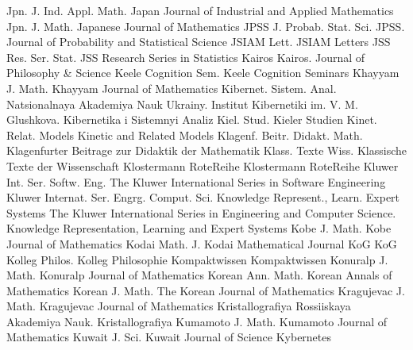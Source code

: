 {Jpn. J. Ind. Appl. Math.}
{Japan Journal of Industrial and Applied Mathematics}
{Jpn. J. Math.}
{Japanese Journal of Mathematics}
{JPSS J. Probab. Stat. Sci.}
{JPSS. Journal of Probability and Statistical Science}
{JSIAM Lett.}
{JSIAM Letters}
{JSS Res. Ser. Stat.}
{JSS Research Series in Statistics}
{Kairos}
{Kairos. Journal of Philosophy & Science}
{Keele Cognition Sem.}
{Keele Cognition Seminars}
{Khayyam J. Math.}
{Khayyam Journal of Mathematics}
{Kibernet. Sistem. Anal.}
{Natsionalnaya Akademiya Nauk Ukrainy. Institut Kibernetiki im. V. M. Glushkova. Kibernetika i Sistemnyi Analiz}
{Kiel. Stud.}
{Kieler Studien}
{Kinet. Relat. Models}
{Kinetic and Related Models}
{Klagenf. Beitr. Didakt. Math.}
{Klagenfurter Beitrage zur Didaktik der Mathematik}
{Klass. Texte Wiss.}
{Klassische Texte der Wissenschaft}
{Klostermann RoteReihe}
{Klostermann RoteReihe}
{Kluwer Int. Ser. Softw. Eng.}
{The Kluwer International Series in Software Engineering}
{Kluwer Internat. Ser. Engrg. Comput. Sci. Knowledge Represent., Learn. Expert Systems}
{The Kluwer International Series in Engineering and Computer Science. Knowledge Representation, Learning and Expert Systems}
{Kobe J. Math.}
{Kobe Journal of Mathematics}
{Kodai Math. J.}
{Kodai Mathematical Journal}
{KoG}
{KoG}
{Kolleg Philos.}
{Kolleg Philosophie}
{Kompaktwissen}
{Kompaktwissen}
{Konuralp J. Math.}
{Konuralp Journal of Mathematics}
{Korean Ann. Math.}
{Korean Annals of Mathematics}
{Korean J. Math.}
{The Korean Journal of Mathematics}
{Kragujevac J. Math.}
{Kragujevac Journal of Mathematics}
{Kristallografiya}
{Rossiiskaya Akademiya Nauk. Kristallografiya}
{Kumamoto J. Math.}
{Kumamoto Journal of Mathematics}
{Kuwait J. Sci.}
{Kuwait Journal of Science}
{Kybernetes}
